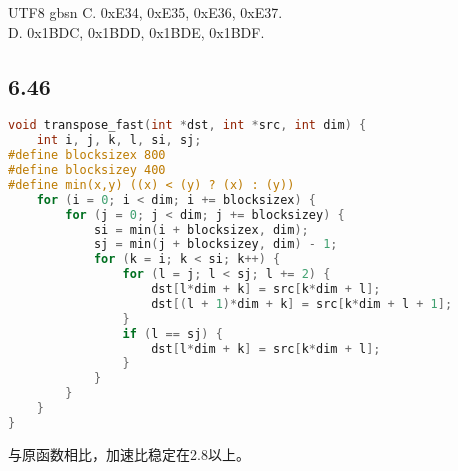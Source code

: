 \documentclass {article}
\begin{document}
\begin {CJK*} {UTF8} {gbsn}
				C. 0xE34, 0xE35, 0xE36, 0xE37.\\

				D. 0x1BDC, 0x1BDD, 0x1BDE, 0x1BDF.\\

			\subsection{6.46}
				\begin{lstlisting}[language=C]
void transpose_fast(int *dst, int *src, int dim) {
	int i, j, k, l, si, sj;
#define blocksizex 800
#define blocksizey 400
#define min(x,y) ((x) < (y) ? (x) : (y))
	for (i = 0; i < dim; i += blocksizex) {
		for (j = 0; j < dim; j += blocksizey) {
			si = min(i + blocksizex, dim);
			sj = min(j + blocksizey, dim) - 1;
			for (k = i; k < si; k++) {
				for (l = j; l < sj; l += 2) {
					dst[l*dim + k] = src[k*dim + l];
					dst[(l + 1)*dim + k] = src[k*dim + l + 1];
				}
				if (l == sj) {
					dst[l*dim + k] = src[k*dim + l];
				}
			}
		}
	}
}
				\end{lstlisting}
				与原函数相比，加速比稳定在2.8以上。\\

  \end {CJK*}
\end{document}
